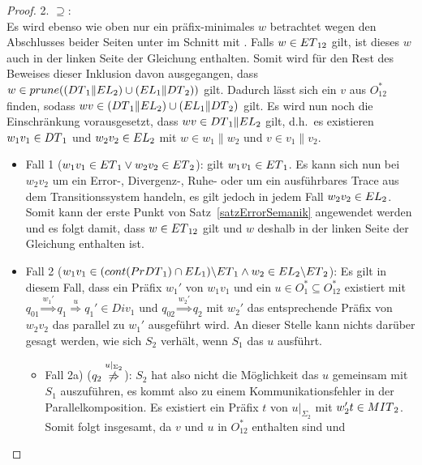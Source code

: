 \begin{proof}
  2. \glqq{}$\supseteq$\grqq{}:\\
  Es wird ebenso wie oben nur ein präfix-minimales $w$ betrachtet wegen den
  Abschlusses beider Seiten unter \cont{} im Schnitt mit \EL{}. Falls
  $w\in ET{}_{12}$ gilt, ist dieses $w$ auch
  in der linken Seite der Gleichung enthalten. Somit wird für den Rest des
  Beweises dieser Inklusion davon ausgegangen, dass
  $w\in prune{}((DT{}_1\|EL{}_2)\cup (EL{}_1\|DT{}_2))$ gilt. Dadurch lässt
  sich ein $v$ aus $O_{12}^*$ finden, sodass $wv\in (DT{}_1\|EL{}_2)\cup
  (EL{}_1\|DT{}_2)$ gilt. Es wird nun noch die Einschränkung vorausgesetzt,
  dass \oBdA{} $wv\in DT{}_1\|EL{}_2$ gilt, d.h.\ es existieren
  $w_1v_1\in DT{}_1$ und $w_2v_2\in EL{}_2$ mit $w\in w_1\|w_2$ und $v\in
  v_1\|v_2$.
  \begin{itemize}
    \item Fall 1 ($w_1v_1\in ET{}_1 \vee w_2v_2\in ET{}_2$): \OBdA{} gilt
      $w_1v_1\in ET{}_1$. Es kann sich nun bei $w_2v_2$ um ein Error-,
      Divergenz-, Ruhe- oder um ein ausführbares Trace aus dem
      Transitionssystem handeln, es gilt jedoch in jedem Fall $w_2v_2\in EL{}_2$.
      Somit kann der erste Punkt von Satz~\ref{satzErrorSemanik} angewendet
      werden und es folgt damit, dass $w\in ET{}_{12}$ gilt und $w$ deshalb in
      der linken Seite der Gleichung enthalten ist.
    \item Fall 2 ($w_1v_1\in (cont{}(PrDT{}_1)\cap EL_1)\backslash ET{}_1
      \wedge w_2\in EL{}_2\backslash ET{}_2$): Es gilt in diesem Fall, dass
      ein Präfix $w_1'$ von $w_1v_1$ und ein $u\in O_1^*\subseteq O_{12}^*$
      existiert mit $q_{01} \overset{w_1'}{\Rightarrow} q_1
      \overset{u}{\Rightarrow} q_1'\in Div_1$ und $q_{02}
      \overset{w_2'}{\Rightarrow} q_2$ mit $w_2'$ das entsprechende Präfix von
      $w_2v_2$ das parallel zu $w_1'$ ausgeführt wird. An dieser Stelle kann
      nichts darüber gesagt werden, wie sich $S_2$ verhält, wenn $S_1$ das $u$
      ausführt.
      \begin{itemize}
        \item Fall 2a) \Big($q_2 \overset{u|_{\Sigma
          _2}}{\not{\hspace{-0.1cm}\Rightarrow}}$\Big): $S_2$ hat also nicht die
          Möglichkeit das $u$ gemeinsam mit $S_1$ auszuführen, es kommt also zu
          einem Kommunikationsfehler in der Parallelkomposition. Es existiert
          ein Präfix $t$ von $u|_{\Sigma _2}$ mit $w_2't\in MIT{}_2$. Somit
          folgt insgesamt, da $v$ und $u$ in $O_{12}^*$ enthalten sind und

\end{itemize}
\end{itemize}
\end{proof}
